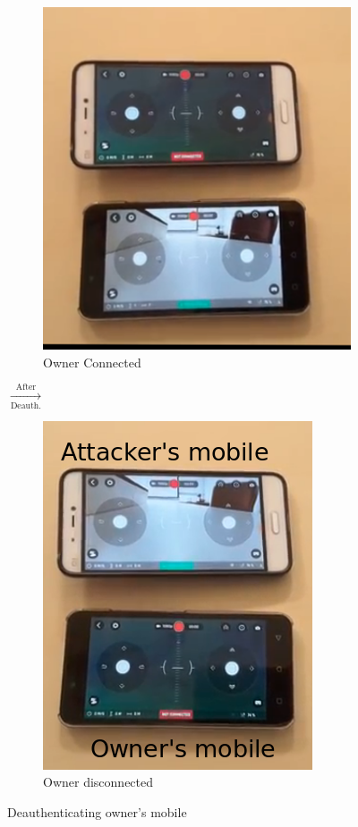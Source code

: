 \documentclass[conference]{IEEEtran}
\begin{document}
\begin{figure}[h!]
	\centering
	\begin{subfigure}{.2\textwidth}
		\centering
		\includegraphics[width=0.85\columnwidth]{disconnec1}
		\caption{Owner Connected}
	\end{subfigure}$\xrightarrow[\text{Deauth.}]{\text{After}}$
	\begin{subfigure}{.2\textwidth}
		\centering
		\includegraphics[width=0.85\columnwidth]{disconn2}
		\caption{Owner disconnected}
	\end{subfigure}
	\caption{Deauthenticating owner's mobile}
	\label{fig:disconnect}
\end{figure}
\end{document}

